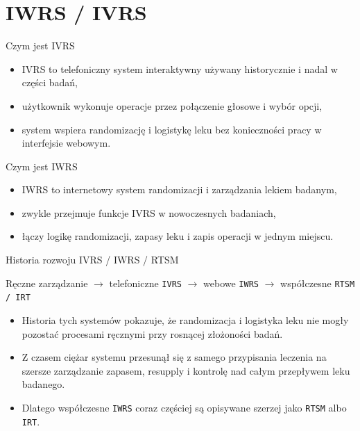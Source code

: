 \section{IWRS / IVRS}


\begin{frame}{Czym jest IVRS}
  \begin{itemize}
    \item IVRS to telefoniczny system interaktywny używany historycznie i nadal w części badań,
    \item użytkownik wykonuje operacje przez połączenie głosowe i wybór opcji,
    \item system wspiera randomizację i logistykę leku bez konieczności pracy w interfejsie webowym.
  \end{itemize}
\end{frame}

\begin{frame}{Czym jest IWRS}
  \begin{itemize}
    \item IWRS to internetowy system randomizacji i zarządzania lekiem badanym,
    \item zwykle przejmuje funkcje IVRS w nowoczesnych badaniach,
    \item łączy logikę randomizacji, zapasy leku i zapis operacji w jednym miejscu.
  \end{itemize}
\end{frame}

\begin{frame}{Historia rozwoju IVRS / IWRS / RTSM}
  \begin{center}
    \Large
    Ręczne zarządzanie $\rightarrow$ telefoniczne \texttt{IVRS} $\rightarrow$ webowe \texttt{IWRS} $\rightarrow$ współczesne \texttt{RTSM / IRT}
  \end{center}

  \vspace{0.45cm}

  \begin{itemize}
    \item Historia tych systemów pokazuje, że randomizacja i logistyka leku nie mogły pozostać procesami ręcznymi przy rosnącej złożoności badań.
    \item Z czasem ciężar systemu przesunął się z samego przypisania leczenia na szersze zarządzanie zapasem, resupply i kontrolę nad całym przepływem leku badanego.
    \item Dlatego współczesne \texttt{IWRS} coraz częściej są opisywane szerzej jako \texttt{RTSM} albo \texttt{IRT}.
  \end{itemize}
\end{frame}


